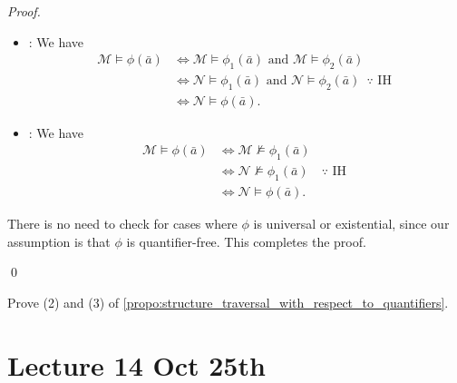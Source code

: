 \documentclass[notoc,notitlepage]{tufte-book}
\begin{document}
\begin{proof}
\begin{enumerate}
\begin{itemize}
\begin{itemize}
            \item {}: We have
              \begin{align*}
                \mathcal{M} \models \phi(\bar{a}) &\iff \mathcal{M} \models \phi_1(\bar{a}) \text{ and } \mathcal{M} \models \phi_2(\bar{a}) \\
                                                  &\iff \mathcal{N} \models \phi_1(\bar{a}) \text{ and } \mathcal{N} \models \phi_2(\bar{a}) \enspace \because \text{ IH } \\
                                                  &\iff \mathcal{N} \models \phi(\bar{a}).
              \end{align*}

            \item {}: We have
              \begin{align*}
                \mathcal{M} \models \phi(\bar{a}) &\iff \mathcal{M} \not\models \phi_1(\bar{a}) \\
                                                  &\iff \mathcal{N} \not\models \phi_1(\bar{a}) \quad \because \text{ IH } \\
                                                  &\iff \mathcal{N} \models \phi(\bar{a}).
              \end{align*}
          \end{itemize}
          There is no need to check for cases where $\phi$ is universal or existential, since our assumption is that $\phi$ is quantifier-free. This completes the proof.
      \end{itemize}
  \end{enumerate}\qed\
\end{proof}

\begin{ex}
  Prove (2) and (3) of \cref{propo:structure_traversal_with_respect_to_quantifiers}.
\end{ex}




\chapter{Lecture 14 Oct 25th}%
\label{chp:lecture_14_oct_25th}
\end{document}

